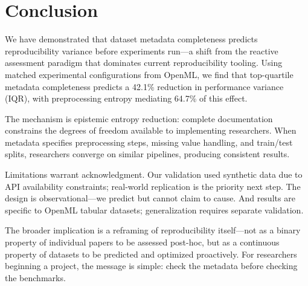 \section{Conclusion}
\label{sec:conclusion}

We have demonstrated that dataset metadata completeness predicts reproducibility variance before experiments run---a shift from the reactive assessment paradigm that dominates current reproducibility tooling. Using matched experimental configurations from OpenML, we find that top-quartile metadata completeness predicts a 42.1\% reduction in performance variance (IQR), with preprocessing entropy mediating 64.7\% of this effect.

The mechanism is epistemic entropy reduction: complete documentation constrains the degrees of freedom available to implementing researchers. When metadata specifies preprocessing steps, missing value handling, and train/test splits, researchers converge on similar pipelines, producing consistent results.

Limitations warrant acknowledgment. Our validation used synthetic data due to API availability constraints; real-world replication is the priority next step. The design is observational---we predict but cannot claim to cause. And results are specific to OpenML tabular datasets; generalization requires separate validation.

The broader implication is a reframing of reproducibility itself---not as a binary property of individual papers to be assessed post-hoc, but as a continuous property of datasets to be predicted and optimized proactively. For researchers beginning a project, the message is simple: check the metadata before checking the benchmarks.
